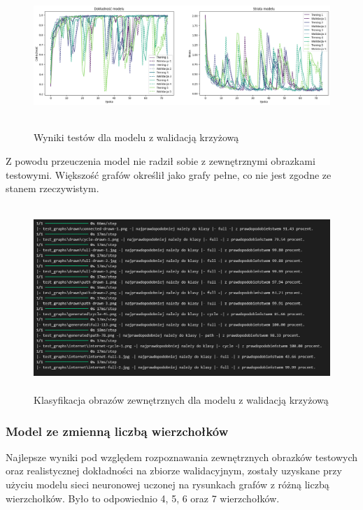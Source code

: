 \begin{figure}[ht]
	\centering
	\includegraphics[height=5.5cm]{resources/tests/images/v2_crossvalid.png}
	\caption{Wyniki testów dla modelu z walidacją krzyżową}
	\label{Fig:tests-cv-1}
\end{figure}
\FloatBarrier

Z powodu przeuczenia model nie radził sobie z zewnętrznymi obrazkami testowymi.
Większość grafów określił jako grafy pełne, co nie jest zgodne ze stanem rzeczywistym.

\begin{figure}[ht]
	\centering
	\includegraphics[height=7cm]{resources/tests/images/v2_crossvalid_img_tests.png}
	\caption{Klasyfikacja obrazów zewnętrznych dla modelu z walidacją krzyżową}
	\label{Fig:tests-cv-2}
\end{figure}
\FloatBarrier

\subsubsection{Model ze zmienną liczbą wierzchołków}
Najlepsze wyniki pod względem rozpoznawania zewnętrznych obrazków testowych
oraz realistycznej dokładności na zbiorze walidacyjnym,
zostały uzyskane przy użyciu modelu sieci neuronowej uczonej na rysunkach grafów z różną liczbą wierzchołków.
Było to odpowiednio 4, 5, 6 oraz 7 wierzchołków.

